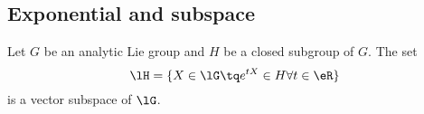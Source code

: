 \subsection{Exponential and subspace}

\begin{lemma}     \label{LEMooFXKBooRnzZKQ}
    Let \( G\) be an analytic Lie group and \( H\) be a closed subgroup of \( G\). The set
    \begin{equation}
        \lH=\{ X\in \lG\tq  e^{tX}\in H\forall t\in \eR \}
    \end{equation}
    is a vector subspace of \( \lG\).
\end{lemma}

